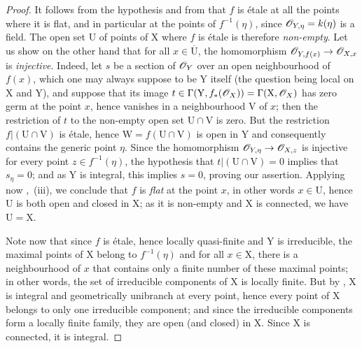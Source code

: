 \begin{proof}
It follows from the hypothesis and from  that $f$ is \'etale at all the points where it is flat, and in particular at the points of $f^{-1}(\eta)$, since $\mathscr{O}_{Y,\eta}=k(\eta)$ is a field.
The open set $\mathrm{U}$ of points of $\mathrm{X}$ where $f$ is \'etale is therefore \emph{non-empty}.
Let us show on the other hand that for all $x\in\overline{\mathrm{U}}$, the homomorphism $\mathscr{O}_{Y,f(x)}\to\mathscr{O}_{X,x}$ is \emph{injective}.
Indeed, let $s$ be a section of $\mathscr{O}_Y$ over an open neighbourhood of $f(x)$, which one may always suppose to be $\mathrm{Y}$ itself (the question being local on $\mathrm{X}$ and $\mathrm{Y}$), and suppose that its image $t\in\Gamma(\mathrm{Y},f_*(\mathscr{O}_X))=\Gamma(\mathrm{X},\mathscr{O}_X)$ has zero germ at the point $x$, hence vanishes in a neighbourhood $\mathrm{V}$ of $x$; then the restriction of $t$ to the non-empty open set $\mathrm{U}\cap\mathrm{V}$ is zero. But the restriction $f|(\mathrm{U}\cap\mathrm{V})$ is \'etale, hence $\mathrm{W}=f(\mathrm{U}\cap\mathrm{V})$ is open in $\mathrm{Y}$ and consequently contains the generic point $\eta$. Since the homomorphism $\mathscr{O}_{Y,\eta}\to\mathscr{O}_{X,z}$ is injective for every point $z\in f^{-1}(\eta)$, the hypothesis that $t|(\mathrm{U}\cap\mathrm{V})=0$ implies that $s_\eta=0$; and as $\mathrm{Y}$ is integral, this implies $s=0$, proving our assertion.
Applying now ,~(iii), we conclude that $f$ is \emph{flat} at the point $x$, in other words $x\in\mathrm{U}$, hence $\mathrm{U}$ is both open and closed in $\mathrm{X}$; as it is non-empty and $\mathrm{X}$ is connected, we have $\mathrm{U}=\mathrm{X}$.

Note now that since $f$ is \'etale, hence locally quasi-finite and $\mathrm{Y}$ is irreducible, the maximal points of $\mathrm{X}$ belong to $f^{-1}(\eta)$  and for all $x\in\mathrm{X}$, there is a neighbourhood of $x$ that contains only a finite number of these maximal points; in other words, the set of irreducible components of $\mathrm{X}$ is locally finite.
But by , $\mathrm{X}$ is integral and geometrically unibranch at every point, hence every point of $\mathrm{X}$ belongs to only one irreducible component; and since the irreducible components form a locally finite family, they are open (and closed) in $\mathrm{X}$. Since $\mathrm{X}$ is connected, it is integral.
\end{proof}

